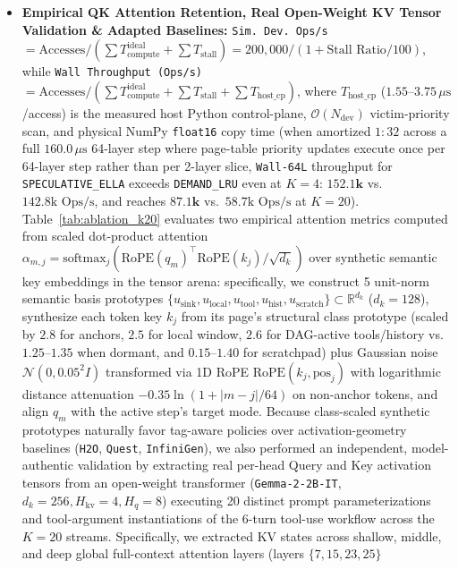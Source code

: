 \documentclass[conference,10pt]{IEEEtran}
\begin{document}
\begin{itemize}
$T_{\text{DMA}}/T_{\text{compute}}$ in Theorem~1). Each logical lookup cycle executes two physical memory-subsystem operations: (1) a Tier-0 HBM page-table directory lookup and tensor slice read, and (2) descriptor metadata/priority state update (paired with an arena-to-arena \texttt{float16} DMA copy between Host DRAM and Device HBM only on cache misses and admitted prefetches). Across $99$ lookup cycles/stream ($396, 792, 1{,}188, 1{,}584,$ and $1{,}980$ logical accesses for $K = 4, 8, 12, 16, 20$), each protocol executes $5{,}940$ logical accesses ($11{,}880$ two-stage memory-subsystem operations).
    \item \textbf{Empirical QK Attention Retention, Real Open-Weight KV Tensor Validation \& Adapted Baselines:} \texttt{Sim.\ Dev.\ Ops/s} $= \text{Accesses} / \mbox{$(\sum T_{\text{compute}}^{\text{ideal}} + \sum T_{\text{stall}})$} = 200{,}000 / (1 + \text{Stall Ratio}/100)$, while \texttt{Wall Throughput (Ops/s)} $= \text{Accesses} / \mbox{$(\sum T_{\text{compute}}^{\text{ideal}} + \sum T_{\text{stall}} + \sum T_{\text{host\_cp}})$}$, where $T_{\text{host\_cp}}$ ($1.55\text{--}3.75\,\mu\text{s}$/access) is the measured host Python control-plane, $\mathcal{O}(N_{\text{dev}})$ victim-priority scan, and physical NumPy \texttt{float16} copy time (when amortized $1:32$ across a full $160.0\,\mu\text{s}$ 64-layer step where page-table priority updates execute once per 64-layer step rather than per 2-layer slice, \texttt{Wall-64L} throughput for \texttt{SPECULATIVE\_ELLA} exceeds \texttt{DEMAND\_LRU} even at $K=4$: $\mathbf{152.1\text{k}}$ vs.\ $142.8\text{k Ops/s}$, and reaches $\mathbf{87.1\text{k}}$ vs.\ $58.7\text{k Ops/s}$ at $K=20$). Table~\ref{tab:ablation_k20} evaluates two empirical attention metrics computed from scaled dot-product attention $\alpha_{m,j} = \text{softmax}_j(\text{RoPE}(q_m)^\top \text{RoPE}(k_j)/\sqrt{d_k})$ over synthetic semantic key embeddings in the tensor arena: specifically, we construct 5 unit-norm semantic basis prototypes $\{u_{\text{sink}}, u_{\text{local}}, u_{\text{tool}}, u_{\text{hist}}, u_{\text{scratch}}\} \subset \mathbb{R}^{d_k}$ ($d_k = 128$), synthesize each token key $k_j$ from its page's structural class prototype (scaled by $2.8$ for anchors, $2.5$ for local window, $2.6$ for DAG-active tools/history vs.\ $1.25\text{--}1.35$ when dormant, and $0.15\text{--}1.40$ for scratchpad) plus Gaussian noise $\mathcal{N}(0, 0.05^2 I)$ transformed via 1D RoPE $\text{RoPE}(k_j, \text{pos}_j)$ with logarithmic distance attenuation $-0.35\ln(1 + |m-j|/64)$ on non-anchor tokens, and align $q_m$ with the active step's target mode. Because class-scaled synthetic prototypes naturally favor tag-aware policies over activation-geometry baselines (\texttt{H2O}, \texttt{Quest}, \texttt{InfiniGen}), we also performed an independent, model-authentic validation by extracting real per-head Query and Key activation tensors from an open-weight transformer (\texttt{Gemma-2-2B-IT}, $d_k=256, H_{\text{kv}}=4, H_q=8$) executing 20 distinct prompt parameterizations and tool-argument instantiations of the 6-turn tool-use workflow across the $K=20$ streams. Specifically, we extracted KV states across shallow, middle, and deep global full-context attention layers (layers $\{7, 15, 23, 25\}$ 
\end{itemize}
\end{document}
